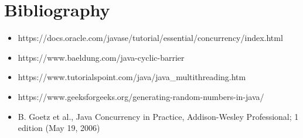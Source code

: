 \documentclass[10pt,a4paper]{article}
\begin{document}
\section{Bibliography}
\begin{itemize}
\item https://docs.oracle.com/javase/tutorial/essential/concurrency/index.html
\item https://www.baeldung.com/java-cyclic-barrier
\item https://www.tutorialspoint.com/java/java\_multithreading.htm
\item https://www.geeksforgeeks.org/generating-random-numbers-in-java/
\item B. Goetz et al., Java Concurrency in Practice, Addison-Wesley Professional; 1 edition (May 19, 2006)

\end{itemize}
\end{document}

